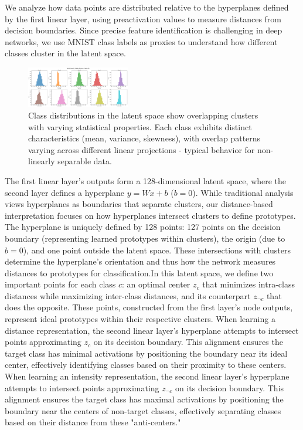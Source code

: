 We analyze how data points are distributed relative to the hyperplanes defined by the first linear layer, using preactivation values to measure distances from decision boundaries. Since precise feature identification is challenging in deep networks, we use MNIST class labels as proxies to understand how different classes cluster in the latent space.
\begin{figure}[H]
    \centering
    \includegraphics[width=0.4\textwidth]{images/distance_distribution}
    \caption{Class distributions in the latent space show overlapping clusters with varying statistical properties. Each class exhibits distinct characteristics (mean, variance, skewness), with overlap patterns varying across different linear projections - typical behavior for non-linearly separable data.}
    \label{fig:distance_distribution}
\end{figure}
The first linear layer's outputs form a 128-dimensional latent space, where the second layer defines a hyperplane $y=Wx+b$ ($b=0$). While traditional analysis views hyperplanes as boundaries that separate clusters, our distance-based interpretation focuses on how hyperplanes intersect clusters to define prototypes. The hyperplane is uniquely defined by 128 points: 127 points on the decision boundary (representing learned prototypes within clusters), the origin (due to $b=0$), and one point outside the latent space. These intersections with clusters determine the hyperplane's orientation and thus how the network measures distances to prototypes for classification.In this latent space, we define two important points for each class $c$: an optimal center $z_c$ that minimizes intra-class distances while maximizing inter-class distances, and its counterpart $z_{\neg c}$ that does the opposite. These points, constructed from the first layer's node outputs, represent ideal prototypes within their respective clusters.
When learning a distance representation, the second linear layer's hyperplane attempts to intersect points approximating $z_c$ on its decision boundary. This alignment ensures the target class has minimal activations by positioning the boundary near its ideal center, effectively identifying classes based on their proximity to these centers.
When learning an intensity representation, the second linear layer's hyperplane attempts to intersect points approximating $z_{\neg c}$ on its decision boundary. This alignment ensures the target class has maximal activations by positioning the boundary near the centers of non-target classes, effectively separating classes based on their distance from these "anti-centers."
